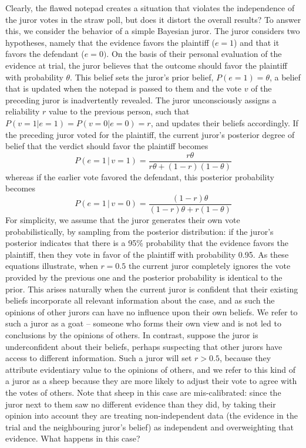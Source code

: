 \documentclass[doc]{apa6}
\newcommand{\given}{\, | \,}
\begin{document}
Clearly, the flawed notepad creates a situation that violates the independence of the juror votes in the straw poll, but does it distort the overall results? To answer this, we consider the behavior of a simple Bayesian juror. The juror considers two hypotheses, namely that the evidence favors the plaintiff ($e=1$) and that it favors the defendant ($e=0)$. On the basis of their personal evaluation of the evidence at trial, the juror believes that the outcome should favor the plaintiff with probability $\theta$. This belief sets the juror's prior belief, $P(e=1)=\theta$, a belief that is updated when the notepad is passed to them and the vote $v$ of the preceding juror is inadvertently revealed. The juror unconsciously assigns a reliability $r$ value to the previous person, such that $P(v=1|e=1) = P(v=0|e=0) = r$, and updates their beliefs accordingly. If the preceding juror voted for the plaintiff, the current juror's posterior degree of belief that the verdict should favor the plaintiff becomes
\begin{equation}
P(e=1 \given v=1) = \frac{r\theta}{r\theta+ (1-r)(1-\theta)}
\label{sheepgoat1}
\end{equation}
whereas if the earlier vote favored the defendant, this posterior probability becomes
\begin{equation}
P(e=1 \given v=0) = \frac{(1-r)\theta}{(1-r)\theta + r(1-\theta)}
\label{sheepgoat2}
\end{equation}
For simplicity, we assume that the juror generates their own vote probabilistically, by sampling from the posterior distribution: if the juror's posterior indicates that there is a 95\% probability that the evidence favors the plaintiff, then they vote in favor of the plaintiff with probability 0.95. As these equations illustrate, when $r=0.5$ the current juror completely ignores the vote provided by the previous one and the posterior probability is identical to the prior. This arises naturally when the current juror is confident that their existing beliefs incorporate all relevant information about the case, and as such the opinions of other jurors can have no influence upon their own beliefs. We refer to such a juror as a {\sc goat} -- someone who forms their own view and is not led to conclusions by the opinions of others. In contrast, suppose the juror is underconfident about their beliefs, perhaps suspecting that other jurors have access to different information. Such a juror will set $r>0.5$, because they attribute evidentiary value to the opinions of others, and we refer to this kind of a juror as a {\sc sheep} because they are more likely to adjust their vote to agree with the votes of others. Note that {\sc sheep} in this case are mis-calibrated: since the juror next to them saw no different evidence than they did, by taking their opinion into account they are treating non-independent data (the evidence in the trial and the neighbouring juror’s belief) as independent and overweighting that evidence. What happens in this case?
\end{document}
